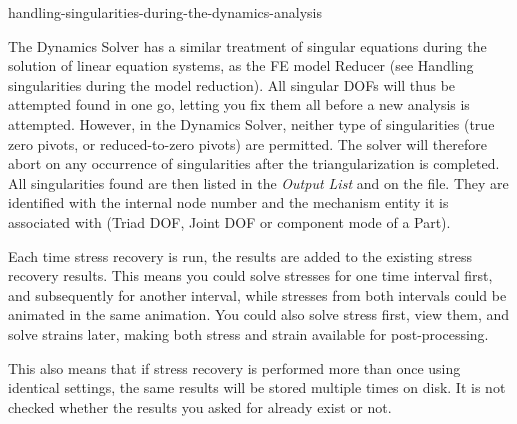 {
           {handling-singularities-during-the-dynamics-analysis}

The Dynamics Solver has a similar treatment of singular equations during
the solution of linear equation systems, as the FE model Reducer (see
           {Handling singularities during the model reduction}).
All singular DOFs will thus be attempted found in one go, letting you fix
them all before a new analysis is attempted. However, in the Dynamics Solver,
neither type of singularities (true zero pivots, or reduced-to-zero pivots) are
permitted. The solver will therefore abort on any occurrence of singularities
after the triangularization is completed.
All singularities found are then listed in the {\sl Output List} and on the
 file. They are identified with the internal node number and the
mechanism entity it is associated with (Triad DOF, Joint DOF or component mode
of a Part).





Each time stress recovery is run, the results are added to the existing stress
recovery results. This means you could solve stresses for one time interval
first, and subsequently for another interval, while stresses from both intervals
could be animated in the same animation.
You could also solve stress first, view them, and solve strains later,
making both stress and strain available for post-processing.

This also means that if stress recovery is performed more than once using
identical settings, the same results will be stored multiple times on disk.
It is not checked whether the results you asked for already exist or not.

}
